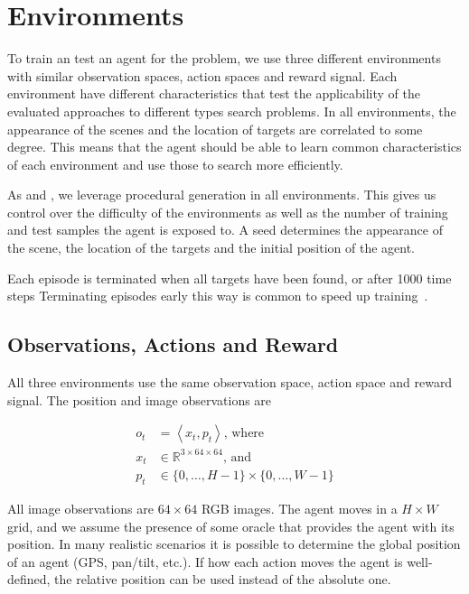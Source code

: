 \section{Environments}
\label{sec:environments}

To train an test an agent for the problem, we use three different environments with similar observation spaces, action spaces and reward signal.
Each environment have different characteristics that test the applicability of the evaluated approaches to different types search problems.
In all environments, the appearance of the scenes and the location of targets are correlated to some degree.
This means that the agent should be able to learn common characteristics of each environment and use those to search more efficiently.

As \cite{cobbe_procgen_2020} and \cite{mnih_asynchronous_2016}, we leverage procedural generation in all environments.
This gives us control over the difficulty of the environments as well as the number of training and test samples the agent is exposed to.
A seed determines the appearance of the scene, the location of the targets and the initial position of the agent.

Each episode is terminated when all targets have been found, or after 1000 time steps
Terminating episodes early this way is common to speed up training~\cite{pardo_timelimits_2022}.

\subsection{Observations, Actions and Reward}

All three environments use the same observation space, action space and reward signal.
The position and image observations are

\begin{align}
    o_t & = \left\langle x_t, p_t \right\rangle \text{, where} \\
    x_t & \in \mathbb{R}^{3 \times 64 \times 64} \text{, and} \\
    p_t & \in \{0, \dots, H-1\} \times \{0, \dots, W-1\}
\end{align}

All image observations are \(64 \times 64\) RGB images.
The agent moves in a \(H \times W\) grid, and we assume the presence of some oracle that provides the agent with its position.
In many realistic scenarios it is possible to determine the global position of an agent (GPS, pan/tilt, etc.).
If how each action moves the agent is well-defined, the relative position can be used instead of the absolute one.

